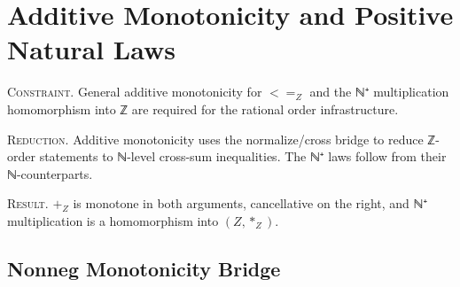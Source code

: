\documentclass[11pt,a4paper]{book}
\def\leq{<=}%
\def\mathbb#1{#1}%
\def\texttt#1{#1}%
\begin{document}
\chapter{Additive Monotonicity and Positive Natural Laws}

\textsc{Constraint.}
General additive monotonicity for $\leq_{\mathbb{Z}}$ and the ℕ⁺ multiplication homomorphism
into ℤ are required for the rational order infrastructure.

\textsc{Reduction.}
Additive monotonicity uses the \texttt{normalize/cross} bridge to reduce ℤ-order statements
to ℕ-level cross-sum inequalities. The ℕ⁺ laws follow from their ℕ-counterparts.

\textsc{Result.}
$+_{\mathbb{Z}}$ is monotone in both arguments, cancellative on the right, and ℕ⁺
multiplication is a homomorphism into $(\mathbb{Z}, *_{\mathbb{Z}})$.

\section{Nonneg Monotonicity Bridge}
\end{document}
